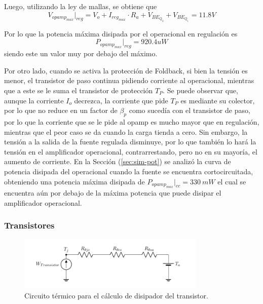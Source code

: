 Luego, utilizando la ley de mallas, se obtiene que
\begin{equation}
	V_{opamp_{max}}|_{reg} = V_o + I_{reg_{max}} \cdot R_a + V_{BE_{Q_2}} + V_{BE_{Q_1}} = 11.8V
\end{equation}

Por lo que la potencia máxima disipada por el operacional en regulación es
\begin{equation}
	P_{opamp_{max}}|_{reg} = 920.4uW
\end{equation}
siendo este un valor muy por debajo del máximo.

Por otro lado, cuando se activa la protección de Foldback, si bien la tensión es menor, el transistor de paso continua pidiendo corriente al operacional, mientras que a este se le suma el transistor de protección $T_P$. Se puede observar que, aunque la corriente $I_o$ decrezca, la corriente que pide $T_P$ es mediante su colector, por lo que no reduce en un factor de $\beta_p$ como sucedía con el transistor de paso, por lo que la corriente que se le pide al opamp es mucho mayor que en regulación, mientras que el peor caso se da cuando la carga tienda a cero. Sin embargo, la tensión a la salida de la fuente regulada disminuye, por lo que también lo hará la tensión en el amplificador operacional, contrarrestando, pero no en su mayoría, el aumento de corriente. En la Sección (\ref{sec:sim-pot}) se analizó la curva de potencia disipada del operacional cuando la fuente se encuentra cortocircuitada, obteniendo una potencia máxima disipada de $P_{opamp_{max}}|_{cc} = 330 \ mW$ el cual se encuentra aún por debajo de la máxima potencia que puede disipar el amplificador operacional.

\subsubsection{Transistores}
\begin{figure}[H]
\centering
	\includegraphics[width=0.8\textwidth, page=1]{ImagenesEjercicio2/Potencia.pdf}
	\caption{Circuito térmico para el cálculo de disipador del transistor.}
	\label{fig:circuitopottrans}
\end{figure}

